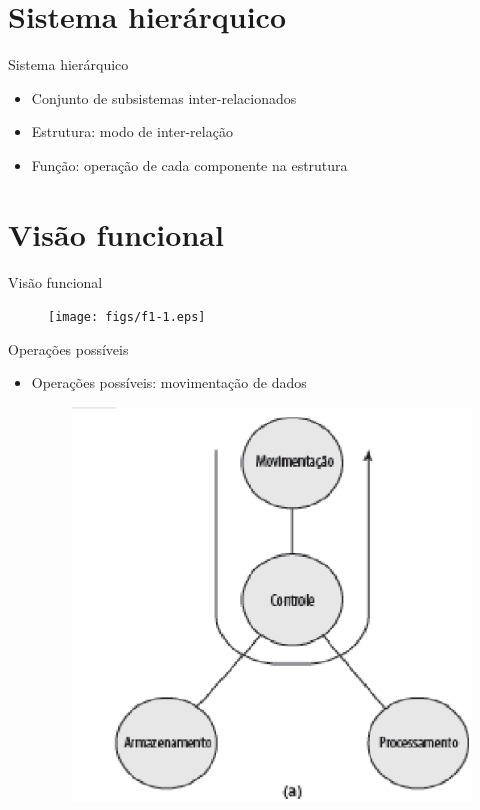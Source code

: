 \section[ slide = true]{Sistema hierárquico}
\begin{slide}[toc=]{Sistema hierárquico}
   \begin{itemize}
         \item Conjunto de subsistemas inter-relacionados
         \item Estrutura: modo de inter-relação
         \item Função: operação de cada componente na estrutura
   \end{itemize}
\end{slide}

\section[ slide = true]{Visão funcional}
 \begin{slide}[toc=]{Visão funcional}
    \begin{figure}[h]
      \centering
      \texttt{[image: figs/f1-1.eps]}
    \end{figure}
\end{slide}

\begin{slide}[toc=]{Operações possíveis}
    \begin{itemize}
       \item Operações possíveis: movimentação de dados
       \begin{figure}[h]
      \centering
      \includegraphics[height = 0.55\textheight]{figs/f1-2a.eps}
    \end{figure}
    \end{itemize}
 \end{slide}

